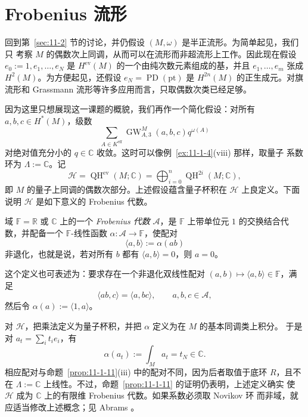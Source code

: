 
\section{Frobenius 流形}\label{sec:11-5}

回到第~\ref{sec:11-2} 节的讨论，并仍假设 $(M,\omega)$ 是半正流形。为简单起见，我们只
考察 $M$ 的偶数次上同调，从而可以在流形而非超流形上工作。因此现在假设
$e_0:=1,e_1,\ldots,e_N$ 是 $H^{\mathrm{ev}}(M)$ 的一个由纯次数元素组成的基，并且
$e_1,\ldots,e_m$ 张成 $H^2(M)$。为方便起见，还假设
$e_N=\operatorname{PD}(\mathrm{pt})$ 是 $H^{2n}(M)$ 的正生成元。对旗流形和 Grassmann
流形等许多应用而言，只取偶数次类已经足够。

因为这里只想展现这一课题的概貌，我们再作一个简化假设：对所有
$a,b,c\in H^*(M)$，级数
\begin{equation}\label{eq:11-5-1}
  \sum_{A\in K^{\mathrm{eff}}}
  \operatorname{GW}^M_{A,3}(a,b,c)q^{\omega(A)}
\end{equation}
对绝对值充分小的 $q\in\mathbb C$ 收敛。这时可以像例~\ref{ex:11-1-4}(viii) 那样，取量子
系数环为 $\Lambda:=\mathbb C$。记
\[
  \mathcal H=\operatorname{QH}^{\mathrm{ev}}(M;\mathbb C)
  =\bigoplus_{i=0}^n\operatorname{QH}^{2i}(M;\mathbb C),
\]
即 $M$ 的量子上同调的偶数次部分。上述假设蕴含量子杯积在 $\mathcal H$ 上良定义。下面
说明 $\mathcal H$ 是如下意义的 Frobenius 代数。

\begin{definition}\label{def:11-5-1}
域 $\mathbb F=\mathbb R$ 或 $\mathbb C$ 上的一个 \emph{Frobenius 代数} $\mathcal A$，是
$\mathbb F$ 上带单位元 $1$ 的交换结合代数，并配备一个 $\mathbb F$-线性函数
$\alpha:\mathcal A\to\mathbb F$，使配对
\[
  \langle a,b\rangle:=\alpha(ab)
\]
非退化，也就是说，若对所有 $b$ 都有 $\langle a,b\rangle=0$，则 $a=0$。
\end{definition}

这个定义也可表述为：要求存在一个非退化双线性配对
$(a,b)\mapsto\langle a,b\rangle\in\mathbb F$，满足
\[
  \langle ab,c\rangle=\langle a,bc\rangle,
  \qquad a,b,c\in\mathcal A,
\]
然后令 $\alpha(a):=\langle1,a\rangle$。

对 $\mathcal H$，把乘法定义为量子杯积，并把 $\alpha$ 定义为在 $M$ 的基本同调类上积分。
于是对 $a_t=\sum_i t_i e_i$，有
\[
  \alpha(a_t):=\int_M a_t=t_N\in\mathbb C.
\]
相应配对与命题~\ref{prop:11-1-11}(iii) 中的配对不同，因为后者取值于底环 $R$，且不在
$\Lambda:=\mathbb C$ 上线性。不过，命题~\ref{prop:11-1-11} 的证明仍表明，上述定义确实
使 $\mathcal H$ 成为 $\mathbb C$ 上的有限维 Frobenius 代数。如果系数必须取 Novikov 环
而非域，就应适当修改上述概念；见 Abrams 。

